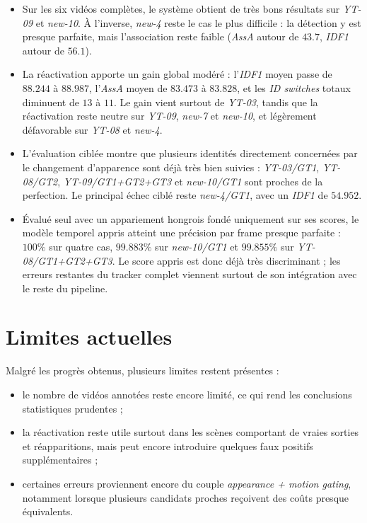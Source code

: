 \documentclass[11pt,a4paper]{article}
\begin{document}
\begin{itemize}
    \item Sur les six vidéos complètes, le système obtient de très bons résultats sur \textit{YT-09} et \textit{new-10}. À l'inverse, \textit{new-4} reste le cas le plus difficile : la détection y est presque parfaite, mais l'association reste faible (\textit{AssA} autour de $43.7$, \textit{IDF1} autour de $56.1$).

    \item La réactivation apporte un gain global modéré : l'\textit{IDF1} moyen passe de $88.244$ à $88.987$, l'\textit{AssA} moyen de $83.473$ à $83.828$, et les \textit{ID switches} totaux diminuent de $13$ à $11$. Le gain vient surtout de \textit{YT-03}, tandis que la réactivation reste neutre sur \textit{YT-09}, \textit{new-7} et \textit{new-10}, et légèrement défavorable sur \textit{YT-08} et \textit{new-4}.

    \item L'évaluation ciblée montre que plusieurs identités directement concernées par le changement d'apparence sont déjà très bien suivies : \textit{YT-03/GT1}, \textit{YT-08/GT2}, \textit{YT-09/GT1+GT2+GT3} et \textit{new-10/GT1} sont proches de la perfection. Le principal échec ciblé reste \textit{new-4/GT1}, avec un \textit{IDF1} de $54.952$.

    \item Évalué seul avec un appariement hongrois fondé uniquement sur ses scores, le modèle temporel appris atteint une précision par frame presque parfaite : $100\%$ sur quatre cas, $99.883\%$ sur \textit{new-10/GT1} et $99.855\%$ sur \textit{YT-08/GT1+GT2+GT3}. Le score appris est donc déjà très discriminant ; les erreurs restantes du tracker complet viennent surtout de son intégration avec le reste du pipeline.
\end{itemize}

\section{Limites actuelles}

Malgré les progrès obtenus, plusieurs limites restent présentes :
\begin{itemize}
    \item le nombre de vidéos annotées reste encore limité, ce qui rend les conclusions statistiques prudentes ;
    \item la réactivation reste utile surtout dans les scènes comportant de vraies sorties et réapparitions, mais peut encore introduire quelques faux positifs supplémentaires ;
    \item certaines erreurs proviennent encore du couple \textit{appearance + motion gating}, notamment lorsque plusieurs candidats proches reçoivent des coûts presque équivalents.
\end{itemize}
\end{document}
